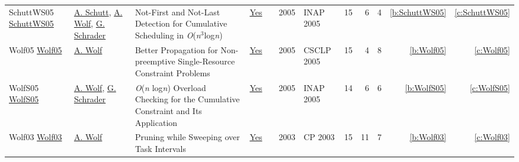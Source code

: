 {\begin{longtable}{>{\raggedright\arraybackslash}p{3cm}>{\raggedright\arraybackslash}p{6cm}>{\raggedright\arraybackslash}p{6.5cm}rrrp{2.5cm}rrrrr}
SchuttWS05 \href{https://doi.org/10.1007/11963578\_6}{SchuttWS05} & \hyperref[auth:a125]{A. Schutt}, \hyperref[auth:a51]{A. Wolf}, \hyperref[auth:a720]{G. Schrader} & Not-First and Not-Last Detection for Cumulative Scheduling in \emph{O}(\emph{n}\({}^{\mbox{3}}\)log\emph{n}) & \href{../works/SchuttWS05.pdf}{Yes} & \cite{SchuttWS05} & 2005 & INAP 2005 & 15 & 6 & 4 & \ref{b:SchuttWS05} & \ref{c:SchuttWS05}\\
Wolf05 \href{http://dx.doi.org/10.1007/11402763_15}{Wolf05} & \hyperref[auth:a51]{A. Wolf} & Better Propagation for Non-preemptive Single-Resource Constraint Problems & \href{../works/Wolf05.pdf}{Yes} & \cite{Wolf05} & 2005 & CSCLP 2005 & 15 & 4 & 8 & \ref{b:Wolf05} & \ref{c:Wolf05}\\
WolfS05 \href{https://doi.org/10.1007/11963578\_8}{WolfS05} & \hyperref[auth:a51]{A. Wolf}, \hyperref[auth:a720]{G. Schrader} & \emph{O}(\emph{n} log\emph{n}) Overload Checking for the Cumulative Constraint and Its Application & \href{../works/WolfS05.pdf}{Yes} & \cite{WolfS05} & 2005 & INAP 2005 & 14 & 6 & 6 & \ref{b:WolfS05} & \ref{c:WolfS05}\\
Wolf03 \href{https://doi.org/10.1007/978-3-540-45193-8\_50}{Wolf03} & \hyperref[auth:a51]{A. Wolf} & Pruning while Sweeping over Task Intervals & \href{../works/Wolf03.pdf}{Yes} & \cite{Wolf03} & 2003 & CP 2003 & 15 & 11 & 7 & \ref{b:Wolf03} & \ref{c:Wolf03}\\
\end{longtable}
}

\clearpage
